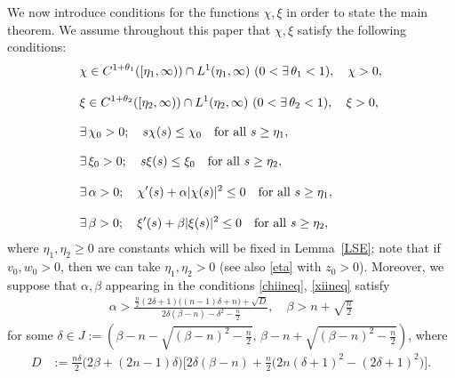 \documentclass[12pt,reqno,draft]{article}
\numberwithin{equation}{section}
\theoremstyle{theorem}
\theoremstyle{definition}
\newcommand{\lam}{\lambda}
\begin{document}
We now introduce conditions for the functions $\chi, \xi$ 
in order to state the main theorem. 
We assume throughout this paper that 
$\chi, \xi$ satisfy the following conditions:
% 
    \begin{align}
            \label{chiclass}
            &\chi \in C^{1+\theta_1}([\eta_1,\infty)) 
                          \cap L^1(\eta_1,\infty)\ 
            (0<\exists\, \theta_1<1),
    \quad 
            \chi>0,  
    \\[3.05mm]
            \label{xiclass}
            &\xi \in C^{1+\theta_2}([\eta_2,\infty)) 
                        \cap L^1(\eta_2,\infty)\ 
            (0<\exists\, \theta_2<1),
    \quad 
            \xi>0,
    \\[3.05mm]
            \label{chibound}
            &\exists\, \chi_0>0;
    \quad 
            s\chi(s) \le \chi_0
    \quad 
            {\rm for\ all}\ s \ge \eta_1,          
    \\[3.05mm]
            \label{xibound}
            &\exists\, \xi_0>0;
    \quad 
            s\xi(s) \le \xi_0
    \quad 
            {\rm for\ all}\ s \ge \eta_2,
    \\[3.05mm]
            \label{chiineq}
            &\exists\, \alpha>0;
    \quad 
            \chi'(s)+\alpha|\chi(s)|^2 \le 0
    \quad 
            {\rm for\ all}\ s \ge \eta_1,
    \\[3.05mm]
            \label{xiineq}
            &\exists\, \beta>0;
    \quad 
            \xi'(s)+\beta|\xi(s)|^2 \le 0
    \quad 
            {\rm for\ all}\ s \ge \eta_2,
    \end{align}
%
where $\eta_1, \eta_2\ge0$ 
are constants which will be fixed 
in Lemma~\ref{LSE}; 
note that if $v_0, w_0>0$, 
then we can take $\eta_1, \eta_2>0$ (see also \eqref{eta} 
with $z_0>0$). 
Moreover, we suppose that $\alpha, \beta$ appearing 
in the conditions \eqref{chiineq}, \eqref{xiineq} satisfy
% 
    \begin{align} \label{condiab}
          \alpha>\frac{\frac{n}{2}(2\delta+1)\big((n-1)\delta+n\big)+\sqrt{D}}
                     {2\delta(\beta-n)-\delta^2-\frac{n}{2}},
    \quad 
          \beta>n+\sqrt{\frac{n}{2}}
    \end{align}
 for some $\delta \in J:= \left(\beta-n-\sqrt{(\beta-n)^2-\frac{n}{2}},\, 
 \beta-n+\sqrt{(\beta-n)^2-\frac{n}{2}}\right)$, where
% 
    \begin{align*}
         D
    &:= \frac{n\delta}{2}\big(2\beta+(2n-1)\delta\big)  
         \Big[
         2\delta(\beta-n)+\frac{n}{2}\Big(2n(\delta+1)^2-(2\delta+1)^2\Big)
         \Big].
    \end{align*}
% 
\end{document}
